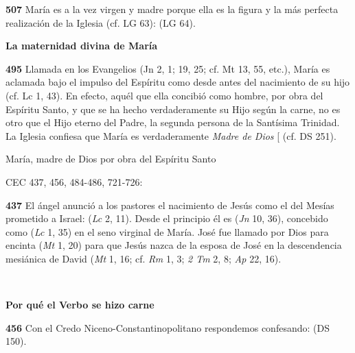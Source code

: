 \textbf{507} María es a la vez virgen y madre porque ella es la figura y la más perfecta realización de la Iglesia (cf. LG 63):  (LG 64).

\textbf{La maternidad divina de María}

\textbf{495} Llamada en los Evangelios  (Jn 2, 1; 19, 25; cf. Mt 13, 55, etc.), María es aclamada bajo el impulso del Espíritu como  desde antes del nacimiento de su hijo (cf. Lc 1, 43). En efecto, aquél que ella concibió como hombre, por obra del Espíritu Santo, y que se ha hecho verdaderamente su Hijo según la carne, no es otro que el Hijo eterno del Padre, la segunda persona de la Santísima Trinidad. La Iglesia confiesa que María es verdaderamente \emph{Madre de Dios} {[}\textquote{Theotokos}{]} (cf. DS 251).

María, madre de Dios por obra del Espíritu Santo

CEC 437, 456, 484-486, 721-726:

\textbf{437} El ángel anunció a los pastores el nacimiento de Jesús como el del Mesías prometido a Israel:  (\emph{Lc} 2, 11). Desde el principio él es  (\emph{Jn} 10, 36), concebido como  (\emph{Lc} 1, 35) en el seno virginal de María. José fue llamado por Dios para  encinta  (\emph{Mt} 1, 20) para que Jesús  nazca de la esposa de José en la descendencia mesiánica de David (\emph{Mt} 1, 16; cf. \emph{Rm} 1, 3; \emph{2 Tm} 2, 8; \emph{Ap} 22, 16).

\textbf{\\ }

\textbf{Por qué el Verbo se hizo carne}

\textbf{456} Con el Credo Niceno-Constantinopolitano respondemos confesando:  (DS 150).

